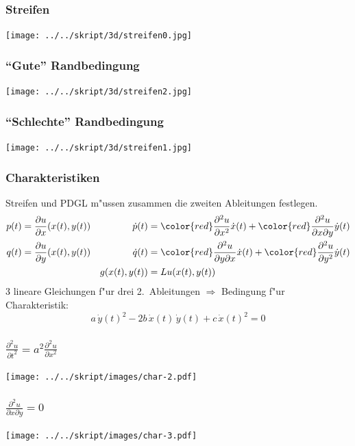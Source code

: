\begin{frame}
\frametitle{Streifen}
\begin{center}
\texttt{[image: ../../skript/3d/streifen0.jpg]}
\end{center}
\end{frame}

\begin{frame}
\frametitle{``Gute'' Randbedingung}
\begin{center}
\texttt{[image: ../../skript/3d/streifen2.jpg]}
\end{center}
\end{frame}

\begin{frame}
\frametitle{``Schlechte'' Randbedingung}
\begin{center}
\texttt{[image: ../../skript/3d/streifen1.jpg]}
\end{center}
\end{frame}

\begin{frame}
\frametitle{Charakteristiken}

Streifen und PDGL m"ussen zusammen die zweiten Ableitungen festlegen.
\begin{align*}
p(t)&=\frac{\partial u}{\partial x}(x(t), y(t))
&
\dot p(t)
&={\color{red} \frac{\partial^2 u}{\partial x^2}}\dot x(t)
+
{\color{red}\frac{\partial^2u}{\partial x\partial y}}\dot y(t)
\\
q(t)&=\frac{\partial u}{\partial y}(x(t), y(t))
&
\dot q(t)
&=
{\color{red}\frac{\partial^2 u}{\partial y\partial x}}\dot x(t)
+
{\color{red}\frac{\partial^2u}{\partial y^2}}\dot y(t)
\\
&&g(x(t),y(t))&=Lu (x(t),y(t))
\end{align*}
3 lineare Gleichungen f"ur drei 2.~Ableitungen
$\Rightarrow$
Bedingung f"ur Charakteristik:
\[
a\,\dot y(t)^2-2b\,\dot x(t)\,\dot y(t)+c\,\dot x(t)^2=0
\]
\end{frame}

\begin{frame}
\frametitle{$\displaystyle \frac{\partial^2u}{\partial t^2}=a^2\frac{\partial^2u}{\partial x^2}$}
\pause
\begin{center}
\texttt{[image: ../../skript/images/char-2.pdf]}
\end{center}
\end{frame}

\begin{frame}
\frametitle{$\displaystyle \frac{\partial^2 u}{\partial x\partial y}=0$}
\pause
\begin{center}
\texttt{[image: ../../skript/images/char-3.pdf]}
\end{center}
\end{frame}

